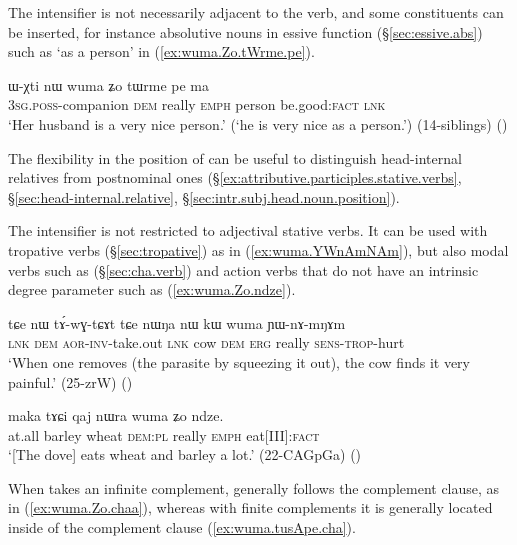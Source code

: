 The intensifier is not necessarily adjacent to the verb, and some constituents can be inserted, for instance absolutive nouns in essive function (§\ref{sec:essive.abs}) such as  `as a person' in (\ref{ex:wuma.Zo.tWrme.pe}).

\begin{exe}
\ex \label{ex:wuma.Zo.tWrme.pe}
\gll ɯ-χti nɯ wuma ʑo tɯrme pe ma \\
\textsc{3sg}.\textsc{poss}-companion \textsc{dem} really \textsc{emph} person be.good:\textsc{fact} \textsc{lnk} \\
\glt `Her husband is a very nice person.' (`he is very nice as a person.') (14-siblings)
()
\end{exe}

The flexibility in the position of  can be useful to distinguish head-internal relatives from postnominal ones (§\ref{ex:attributive.participles.stative.verbs}, §\ref{sec:head-internal.relative}, §\ref{sec:intr.subj.head.noun.position}).

The intensifier  is not restricted to adjectival stative verbs. It can be used with tropative verbs (§\ref{sec:tropative}) as in (\ref{ex:wuma.YWnAmNAm}), but also modal verbs such as  (§\ref{sec:cha.verb}) and action verbs that do not have an intrinsic degree parameter such as  (\ref{ex:wuma.Zo.ndze}).

\begin{exe}
\ex \label{ex:wuma.YWnAmNAm}
\gll  tɕe nɯ tɤ́-wɣ-tɕɤt tɕe nɯŋa nɯ kɯ wuma ɲɯ-nɤ-mŋɤm  \\
\textsc{lnk} \textsc{dem} \textsc{aor}-\textsc{inv}-take.out \textsc{lnk} cow \textsc{dem} \textsc{erg} really \textsc{sens}-\textsc{trop}-hurt  \\
\glt `When one removes (the parasite by squeezing it out), the cow finds it very painful.' (25-zrW)
()
\end{exe}

\begin{exe}
\ex \label{ex:wuma.Zo.ndze}
\gll  maka tɤɕi qaj nɯra wuma ʑo ndze. \\
at.all barley wheat \textsc{dem}:\textsc{pl} really \textsc{emph} eat[III]:\textsc{fact} \\
\glt `[The dove] eats wheat and barley a lot.' (22-CAGpGa)
()
\end{exe}

When  takes an infinite complement,  generally follows the complement clause, as in (\ref{ex:wuma.Zo.chaa}), whereas with finite complements it is generally located inside of the complement clause (\ref{ex:wuma.tusApe.cha}).

